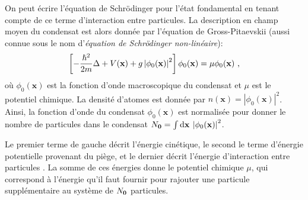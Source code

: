 On peut écrire l'équation de Schrödinger pour l'état fondamental en tenant compte de ce terme d'interaction entre particules. La description en champ moyen du condensat est alors donnée par l'équation de Gross-Pitaevskii (aussi connue sous le nom d'\emph{équation de Schrödinger non-linéaire}):
\begin{equation}
\left[ -\frac{\hslash^2}{2m}\Delta + V(\mathbf{x}) + g\left|\phi_0(\mathbf{x})\right|^2 \right] \phi_0(\mathbf{x}) = \mu \phi_0(\mathbf{x}) \text{ ,}
\label{eq:gross_pitaevskii}
\end{equation}
où $\phi_0(\mathbf{x})$ est la fonction d'onde macroscopique du condensat et $\mu$ est le potentiel chimique. La densité d'atomes est donnée par $n(\mathbf{x})=\left| \phi_0(\mathbf{x}) \right|^2$. Ainsi, la fonction d'onde du condensat $\phi_0(\mathbf{x})$ est normalisée pour donner le nombre de particules dans le condensat $N_{\mathbf{0}}=\int{\mathop{}\mathopen{}\mathrm{d}\mathbf{x} \: \left| \phi_0(\mathbf{x}) \right|^2}$.

Le premier terme de gauche décrit l'énergie cinétique, le second le terme d'énergie potentielle provenant du piège, et le dernier décrit l'énergie d'interaction entre particules%
. La somme de ces énergies donne le potentiel chimique $\mu$, qui correspond à l'énergie qu'il faut fournir pour rajouter une particule supplémentaire au système de $N_{\mathbf{0}}$ particules.




